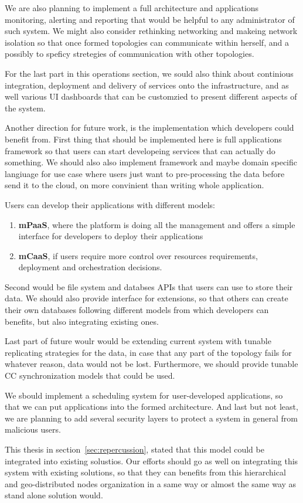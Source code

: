 We are also planning to implement a full architecture and applications monitoring, alerting and reporting that would be helpful to any administrator of such system. We might also consider rethinking networking and makeing network isolation so that once formed topologies can communicate within herself, and a possibly to speficy 
stretegies of communication with other topologies.
 
For the last part in this operations section, we sould also think about continious integration, deployment and delivery of services onto the infrastructure, and as well various UI dashboards that can be customzied to present different aspects of the system.

Another direction for future work, is the implementation which developers could benefit from. First thing that should be implemented here is full applications framework so that users can start developeing services that can actually do something. We should also also implement framework and maybe domain specific langiuage for use case where users just want to pre-processing the data before send it to the cloud, on more convinient than writing whole application.

Users can develop their applications with different models: 

\begin{enumerate}[start=1,label={(\bfseries \arabic*)}]
	\item \textbf{mPaaS}, where the platform is doing all the management and offers a simple interface for developers to deploy their applications
	\item \textbf{mCaaS}, if users require more control over resources requirements, deployment and orchestration decisions.
\end{enumerate}

Second would be file system and databses APIs that users can use to store their data. We should also provide interface for extensions, so that others can create their own databases following different models from which developers can benefits, but also integrating existing ones.

Last part of future woulr would be extending current system with tunable replicating strategies for the data, in case that any part of the topology fails for whatever reason, data would not be lost. Furthermore, we should provide tunable CC synchronization models that could be used.

We sbould implement a scheduling system for user-developed applications, so that we can put applications into the formed architecture. And last but not least, we are planning to add several security layers to protect a system in general from malicious users.

This thesis in section~\ref{sec:repercussion}, stated that this model could be integrated into existing solustios. Our efforts should go as well on integrating this system with existing solutions, so that they can benefits from this hierarchical and geo-distributed nodes organization in a same way or almost the same way as stand alone solution would.
%
%